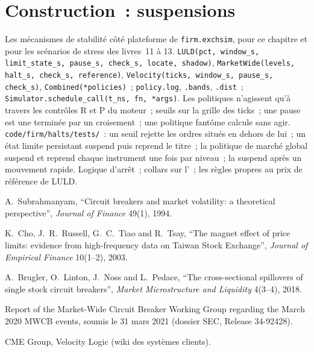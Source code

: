 \section{Construction~: suspensions}\label{bld:mx:circuit-breakers-and-halts:halts}

\begin{build}
 Les mécanismes de stabilité côté plateforme de \texttt{firm.exchsim}, pour ce chapitre et pour les scénarios de stress des livres~11 à 13.
 \texttt{LULD(pct, window\_s, limit\_state\_s, pause\_s, check\_s, locate, shadow)},
\texttt{MarketWide(levels, halt\_s, check\_s, reference)}, \texttt{Velocity(ticks, window\_s, pause\_s, check\_s)}, \texttt{Combined(*policies)}~; \texttt{policy.log}, \texttt{.bands},
\texttt{.dist}~; \texttt{Simulator.schedule\_call(t\_ns, fn, *args)}.
 Les politiques n'agissent qu'à travers les contrôles R et P du moteur~; seuils sur la grille des ticks~; une pause est une  terminée par un croisement~; une
politique fantôme calcule sans agir.
 \texttt{code/firm/halts/tests/}~: un seuil rejette les ordres situés en dehors de lui~; un état limite persistant suspend puis reprend le titre~; la
politique de marché global suspend et reprend chaque instrument une fois par niveau~; la  suspend après un mouvement rapide.
 Logique d'arrêt~; collars sur l'~; les règles propres au prix de référence de LULD.
\end{build}

\begin{omsources}
\item A.~Subrahmanyam, ``Circuit breakers and market volatility: a theoretical perspective'', \emph{Journal of Finance} 49(1), 1994.
\item K.~Cho, J.~R.~Russell, G.~C.~Tiao and R.~Tsay, ``The magnet effect of price limits: evidence from high-frequency data on Taiwan Stock
Exchange'', \emph{Journal of Empirical Finance} 10(1--2), 2003.
\item A.~Brugler, O.~Linton, J.~Noss and L.~Pedace, ``The cross-sectional spillovers of single stock circuit breakers'', \emph{Market Microstructure and
Liquidity} 4(3--4), 2018.
\item Report of the Market-Wide Circuit Breaker Working Group regarding the March 2020 MWCB events, soumis le 31 mars 2021 (dossier SEC, Release 34-92428).
\item CME Group, Velocity Logic (wiki des systèmes clients).
\end{omsources}

